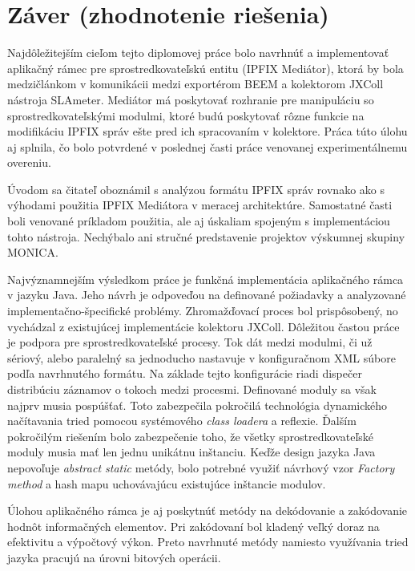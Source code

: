 \section{Z\'aver (zhodnotenie rie\v{s}enia)}

Najdôležitejším cieľom tejto diplomovej práce bolo navrhnúť a implementovať aplikačný rámec pre 
sprostredkovateľskú entitu (IPFIX Mediátor), ktorá by bola medzičlánkom v komunikácii medzi exportérom
BEEM a kolektorom JXColl nástroja SLAmeter. Mediátor má poskytovať rozhranie pre manipuláciu so 
sprostredkovateľskými modulmi, ktoré budú poskytovať rôzne funkcie na modifikáciu IPFIX správ ešte pred ich 
spracovaním v kolektore. Práca túto úlohu aj splnila, čo bolo potvrdené v poslednej časti 
práce venovanej experimentálnemu overeniu.

Úvodom sa čitateľ oboznámil s analýzou formátu IPFIX správ rovnako ako s výhodami použitia 
IPFIX Mediátora v meracej architektúre. Samostatné časti boli venované príkladom použitia, ale aj 
úskaliam spojeným s implementáciou tohto nástroja. Nechýbalo ani stručné predstavenie projektov výskumnej 
skupiny MONICA.

Najvýznamnejším výsledkom práce je funkčná implementácia aplikačného rámca v jazyku Java. Jeho návrh je 
odpoveďou na definované požiadavky a analyzované implementačno-špecifické problémy. Zhromažďovací proces 
bol prispôsobený, no vychádzal z existujúcej implementácie kolektoru JXColl. Dôležitou častou práce je 
podpora pre sprostredkovateľské procesy. Tok dát medzi modulmi, či už sériový, alebo paralelný sa  
jednoducho nastavuje v konfiguračnom XML súbore podľa navrhnutého formátu. Na základe tejto konfigurácie 
riadi dispečer distribúciu záznamov o tokoch medzi procesmi. Definované moduly sa však najprv musia 
pospúšťať. Toto zabezpečila pokročilá technológia dynamického načítavania tried pomocou 
systémového \emph{class loadera} a reflexie. Ďalším pokročilým riešením bolo zabezpečenie toho, že 
všetky sprostredkovateľské moduly musia mať len jednu unikátnu inštanciu. Keďže design jazyka Java 
nepovoľuje \emph{abstract static} metódy, bolo potrebné využiť návrhový vzor \emph{Factory method} a 
hash mapu uchovávajúcu existujúce inštancie modulov. 

Úlohou aplikačného rámca je aj poskytnúť metódy na dekódovanie a zakódovanie hodnôt informačných elementov.
Pri zakódovaní bol kladený veľký doraz na efektivitu a výpočtový výkon. Preto navrhnuté metódy namiesto 
využívania tried jazyka pracujú na úrovni bitových operácii.









